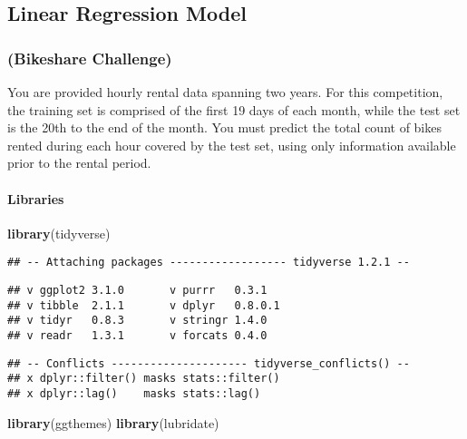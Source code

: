 \documentclass[]{article}
\title{}
\author{}
\date{}
\newenvironment{Shaded}{\begin{snugshade}}{\end{snugshade}}
\newcommand{\KeywordTok}[1]{\textcolor[rgb]{0.13,0.29,0.53}{\textbf{#1}}}
\newcommand{\NormalTok}[1]{#1}
\let\oldparagraph\paragraph
\renewcommand{\paragraph}[1]{\oldparagraph{#1}\mbox{}}
\begin{document}
\subsection{Linear Regression Model}\label{linear-regression-model}

\subsubsection{(Bikeshare Challenge)}\label{bikeshare-challenge}

You are provided hourly rental data spanning two years. For this
competition, the training set is comprised of the first 19 days of each
month, while the test set is the 20th to the end of the month. You must
predict the total count of bikes rented during each hour covered by the
test set, using only information available prior to the rental period.

\paragraph{Libraries}\label{libraries}

\begin{Shaded}
\begin{Highlighting}[]
\KeywordTok{library}\NormalTok{(tidyverse)}
\end{Highlighting}
\end{Shaded}

\begin{verbatim}
## -- Attaching packages ------------------ tidyverse 1.2.1 --
\end{verbatim}

\begin{verbatim}
## v ggplot2 3.1.0       v purrr   0.3.1  
## v tibble  2.1.1       v dplyr   0.8.0.1
## v tidyr   0.8.3       v stringr 1.4.0  
## v readr   1.3.1       v forcats 0.4.0
\end{verbatim}

\begin{verbatim}
## -- Conflicts --------------------- tidyverse_conflicts() --
## x dplyr::filter() masks stats::filter()
## x dplyr::lag()    masks stats::lag()
\end{verbatim}

\begin{Shaded}
\begin{Highlighting}[]
\KeywordTok{library}\NormalTok{(ggthemes)}
\KeywordTok{library}\NormalTok{(lubridate)}
\end{Highlighting}
\end{Shaded}
\end{document}
